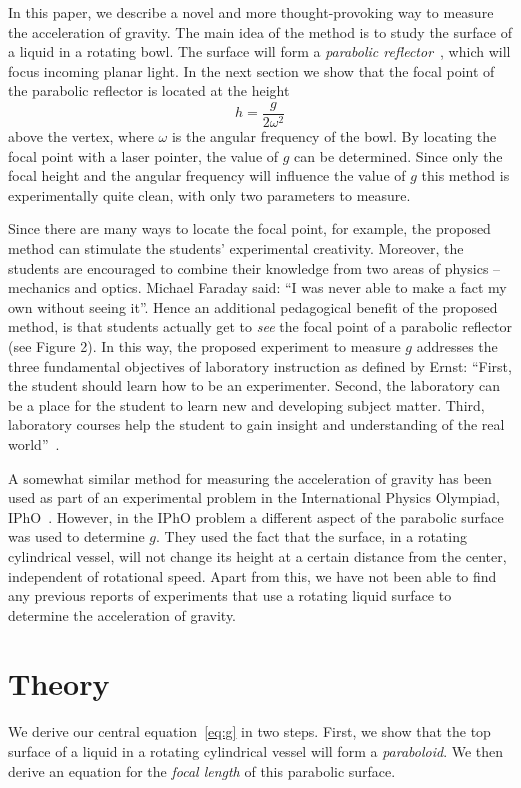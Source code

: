 \documentclass[12pt, a4paper, twocolumn]{article}
\begin{document}
In this paper, we describe a novel and more thought-provoking way to measure the acceleration of gravity. The main idea of the method is to study the surface of a liquid in a rotating bowl. The surface will form a \emph{parabolic reflector}~\cite{Berg1990}, which will focus incoming planar light. In the next section we show that the focal point of the parabolic reflector is located at the height
\begin{equation}\label{eq:g}
h=\frac{g}{2\omega^2}
\end{equation}
above the vertex, where $\omega$ is the angular frequency of the bowl. By locating the focal point with a laser pointer, the value of $g$ can be determined. Since only the focal height and the angular frequency will influence the value of $g$ this method is experimentally quite clean, with only two parameters to measure. 

Since there are many ways to locate the focal point, for example, the proposed method can stimulate the students' experimental creativity. Moreover, the students are encouraged to combine their knowledge from two areas of physics -- mechanics and optics. Michael Faraday said: 
``I was never able to make a fact my own without seeing it''.
Hence an additional pedagogical benefit of the proposed method, is that students actually get to \emph{see} the focal point of a parabolic reflector (see Figure 2). In this way, the proposed experiment to measure $g$ addresses the three fundamental objectives of laboratory instruction as defined by Ernst:
``First, the student should learn how to be an experimenter. Second, the laboratory can be a place for the student to learn new and developing subject matter. Third, laboratory courses help the student to gain insight and understanding of the real world''~\cite{Ernst1983}.

A somewhat similar method for measuring the acceleration of gravity has been used as part of an experimental problem in the International Physics Olympiad, IPhO~\cite{IPhO2001}. However, in the IPhO problem a different aspect of the parabolic surface was used to determine $g$. They used the fact that the surface, in a rotating cylindrical vessel, will not change its height at a certain distance from the center, independent of rotational speed. Apart from this, we have not been able to find any previous reports of experiments that use a rotating liquid surface to determine the acceleration of gravity.

\section{Theory}
We derive our central equation~\eqref{eq:g} in two steps. First, we show that the top surface of a liquid in a rotating cylindrical vessel will form a \emph{paraboloid}. We then derive an equation for the \emph{focal length} of this parabolic surface.
\end{document}
